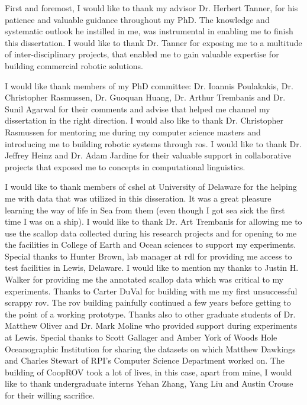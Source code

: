 First and foremost, I would like to thank my advisor Dr. Herbert Tanner, for his patience and valuable guidance throughout my PhD. The knowledge and systematic outlook he instilled in me, was instrumental in enabling me to finish this dissertation. I would like to thank Dr. Tanner for exposing me to a multitude of inter-disciplinary projects, that enabled me to gain valuable expertise for building commercial robotic solutions.

I would like thank members of my PhD committee: Dr. Ioannis Poulakakis, 
Dr. Christopher Rasmussen, Dr. Guoquan Huang, Dr. Arthur Trembanis and Dr. Sunil Agarwal for their comments and advise that helped me channel my dissertation in the right direction. I would also like to thank Dr. Christopher Rasmussen for mentoring me during my computer science masters and introducing me to building robotic systems through \gls{ros}. I would like to thank Dr. Jeffrey Heinz and Dr. Adam Jardine for their valuable support in collaborative projects that exposed me to concepts in computational linguistics.

I would like to thank members of \gls{cshel} at University of Delaware for the helping me with data that was utilized in this disseration. It was a great pleasure learning the way of life in Sea from them (even though I got sea sick the first time I was on a ship). I would like to thank Dr. Art Trembanis for allowing me to use the scallop data collected during his research projects and for opening to me the facilities in College of Earth and Ocean sciences to support my experiments. Special thanks to Hunter Brown, lab manager at \gls{rdl} for providing me access to test facilities in Lewis, Delaware. I would like to mention my thanks to Justin H. Walker for providing me the annotated scallop data which was critical to my experiments. Thanks to Carter DuVal for building with me my first unsuccessful scrappy \gls{rov}. The \gls{rov} building painfully continued a few years before getting to the point of a working prototype. Thanks also to other graduate students of Dr. Matthew Oliver and Dr. Mark Moline who provided 
support during experiments at Lewis. Special thanks to Scott Gallager and Amber York of Woods Hole Oceanographic Institution for sharing the datasets on which Matthew Dawkings and Charles Stewart of RPI’s Computer Science Department worked on. The building of CoopROV took a lot of lives, in this case, apart from mine, I would like to thank undergraduate interns Yehan Zhang, Yang Liu and Austin Crouse for their willing sacrifice.

